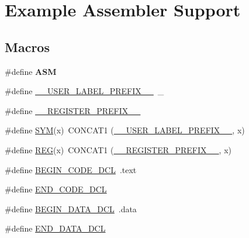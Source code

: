 \hypertarget{group__RTEMSScoreCPUExampleASM}{}\section{Example Assembler Support}
\label{group__RTEMSScoreCPUExampleASM}
\subsection*{Macros}
\begin{DoxyCompactItemize}
\item 
\mbox{\label{group__RTEMSScoreCPUExampleASM_gaa4490105d639938ba5c00b4e9e647e27}} 
\#define {\bfseries A\+SM}
\item 
\#define \mbox{\hyperlink{group__RTEMSScoreCPUExampleASM_gaff6bf0ff0fa3b5cbd23a8ae1131c87a9}{\+\_\+\+\_\+\+U\+S\+E\+R\+\_\+\+L\+A\+B\+E\+L\+\_\+\+P\+R\+E\+F\+I\+X\+\_\+\+\_\+}}~\+\_\+
\item 
\#define \mbox{\hyperlink{group__RTEMSScoreCPUExampleASM_ga08d4062230ffc8494f4be4f6447497e4}{\+\_\+\+\_\+\+R\+E\+G\+I\+S\+T\+E\+R\+\_\+\+P\+R\+E\+F\+I\+X\+\_\+\+\_\+}}
\item 
\#define \mbox{\hyperlink{group__RTEMSScoreCPUExampleASM_gafe05d428a5f345f51fb591debb815325}{S\+YM}}(x)~C\+O\+N\+C\+A\+T1 (\mbox{\hyperlink{group__RTEMSScoreCPUx86-64ASM_gaff6bf0ff0fa3b5cbd23a8ae1131c87a9}{\+\_\+\+\_\+\+U\+S\+E\+R\+\_\+\+L\+A\+B\+E\+L\+\_\+\+P\+R\+E\+F\+I\+X\+\_\+\+\_\+}}, x)
\item 
\#define \mbox{\hyperlink{group__RTEMSScoreCPUExampleASM_gacee196421e9a06f7700bb3064b13b37a}{R\+EG}}(x)~C\+O\+N\+C\+A\+T1 (\mbox{\hyperlink{group__RTEMSScoreCPUV850ASM_ga08d4062230ffc8494f4be4f6447497e4}{\+\_\+\+\_\+\+R\+E\+G\+I\+S\+T\+E\+R\+\_\+\+P\+R\+E\+F\+I\+X\+\_\+\+\_\+}}, x)
\item 
\#define \mbox{\hyperlink{group__RTEMSScoreCPUExampleASM_ga63dd305e6cb437ad2dc29a4184f96fbc}{B\+E\+G\+I\+N\+\_\+\+C\+O\+D\+E\+\_\+\+D\+CL}}~.text
\item 
\#define \mbox{\hyperlink{group__RTEMSScoreCPUExampleASM_gad7bee6a7cae4ed99b9f83f54afaecec8}{E\+N\+D\+\_\+\+C\+O\+D\+E\+\_\+\+D\+CL}}
\item 
\#define \mbox{\hyperlink{group__RTEMSScoreCPUExampleASM_ga7f059077f76d2de57e245990dc6fdf25}{B\+E\+G\+I\+N\+\_\+\+D\+A\+T\+A\+\_\+\+D\+CL}}~.data
\item 
\#define \mbox{\hyperlink{group__RTEMSScoreCPUExampleASM_gaba5951c6a7df52e7c13d07a6823e9758}{E\+N\+D\+\_\+\+D\+A\+T\+A\+\_\+\+D\+CL}}

\end{DoxyCompactItemize}
